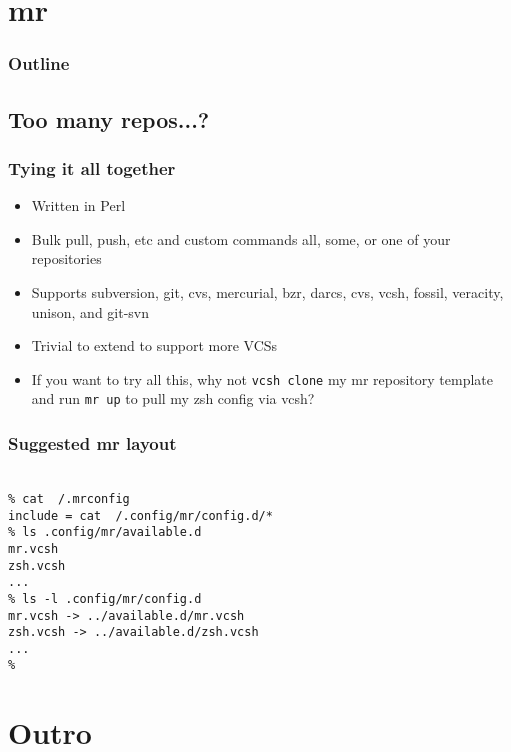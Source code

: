 \documentclass[t]{beamer}
\begin{document}
\section{mr}

\begin{frame}
	\frametitle{Outline}
	\tableofcontents[currentsection]
\end{frame}

\subsection{Too many repos...?}

\begin{frame}
	\frametitle{Tying it all together}
	\begin{itemize}
		\item Written in Perl
		\item Bulk pull, push, etc and custom commands all, some, or one of your repositories
		\item Supports subversion, git, cvs, mercurial, bzr, darcs, cvs, vcsh, fossil, veracity, unison, and git-svn
		\item Trivial to extend to support more VCSs
		\item If you want to try all this, why not \texttt{vcsh clone} my mr repository template and run \texttt{mr up} to pull my zsh config via vcsh?
	\end{itemize}
\end{frame}

\begin{frame}
	\frametitle{Suggested mr layout}
	\texttt{ \\
		\% cat ~/.mrconfig \\
		include = cat ~/.config/mr/config.d/* \\
		\% ls .config/mr/available.d \\
		mr.vcsh \\
		zsh.vcsh \\
		... \\
		\% ls -l .config/mr/config.d \\
		mr.vcsh -> ../available.d/mr.vcsh \\
		zsh.vcsh -> ../available.d/zsh.vcsh \\
		... \\
		\%
	}
\end{frame}


\section{Outro}
\end{document}
